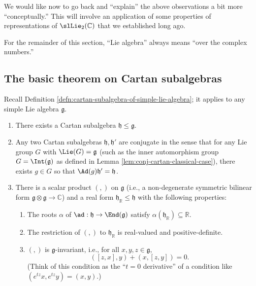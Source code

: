 \documentclass[reqno]{amsart} 
\begin{document}
We would like now to go back and ``explain'' the above observations a bit more ``conceptually.''  This will involve an application of some properties of representations of $\slLie_2(\mathbb{C})$ that we established long ago.

For the remainder of this section, ``Lie algebra'' always means ``over the complex numbers.''

\subsection{The basic theorem on Cartan subalgebras}
\label{sec:org60618cb}
Recall Definition \ref{defn:cartan-subalgebra-of-simple-lie-algebra}; it applies to any simple Lie algebra $\mathfrak{g}$.
\begin{theorem}\label{thm:cartan-subalgebras}
  \begin{enumerate}
  \item There exists a Cartan subalgebra $\mathfrak{h} \leq \mathfrak{g}$.
  \item Any two Cartan subalgebras $\mathfrak{h}, \mathfrak{h} '$ are conjugate in the sense that for any Lie group $G$ with $\Lie(G) = \mathfrak{g}$ (such as the inner automorphism group $G = \Int(\mathfrak{g})$ as defined in Lemma \ref{lem:conj-cartan-classical-case}), there exists $g \in G$ so that $\Ad(g) \mathfrak{h} ' = \mathfrak{h}$.
  \item There is a scalar product $(,)$ on $\mathfrak{g}$ (i.e., a non-degenerate symmetric bilinear form $\mathfrak{g} \otimes \mathfrak{g} \rightarrow \mathbb{C}$) and a real form $\mathfrak{h}_\mathbb{R} \leq \mathfrak{h}$ with the following properties:
    \begin{enumerate}
    \item The roots $\alpha$ of $\ad : \mathfrak{h} \rightarrow \End(\mathfrak{g})$ satisfy $\alpha(\mathfrak{h}_\mathbb{R}) \subseteq \mathbb{R}$.
    \item The restriction of $(,)$ to $\mathfrak{h}_\mathbb{R}$ is real-valued and positive-definite.
    \item $(,)$ is $\mathfrak{g}$-invariant, i.e., for all $x,y,z \in \mathfrak{g}$,
      \begin{equation*}
        ([z,x],y) + (x,[z,y]) = 0.
      \end{equation*}
      (Think of this condition as the ``$t = 0$ derivative'' of a condition like $(e^{t z} x, e^{t z} y) = (x,y)$.)
    \end{enumerate}
  \end{enumerate}
\end{theorem}
\end{document}
